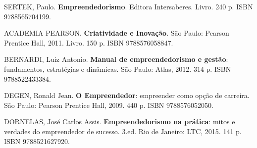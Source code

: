 \begin{pud}
\begin{bibbasica}
		\item SERTEK, Paulo. \textbf{Empreendedorismo}.  Editora Intersaberes. Livro. 240 p.  ISBN 9788565704199.  %
         
		
	\end{bibbasica}
	
	\begin{bibcomplementar}
		\item ACADEMIA PEARSON. \textbf{Criatividade e Inovação}. São Paulo: Pearson Prentice Hall, 2011. Livro. 150 p. ISBN 9788576058847. 
        \item BERNARDI, Luiz Antonio. \textbf{Manual de empreendedorismo e gestão}: fundamentos, estratégias e dinâmicas. São Paulo: Atlas, 2012. 314 p. ISBN 9788522433384. 
		
        \item DEGEN, Ronald Jean. \textbf{O Empreendedor}: empreender como opção de carreira. São Paulo: Pearson Prentice Hall, 2009. 440 p. ISBN 9788576052050.  
        		\item DORNELAS, José Carlos Assis. \textbf{Empreendedorismo na prática}:  mitos e verdades do empreendedor de sucesso. 3.ed. Rio de Janeiro: LTC, 2015. 141 p. ISBN 9788521627920. 
       

\end{bibcomplementar}
\end{pud}
